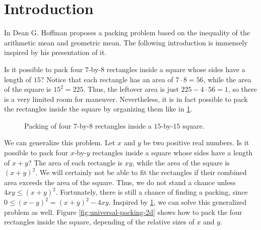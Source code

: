 \section{Introduction}
\noindent In \cite{Hoffman1981} Dean G. Hoffman proposes a packing problem based on the inequality of the arithmetic mean and geometric mean. The following introduction is immensely inspired by his presentation of it.

Is it possible to pack four $7$-by-$8$ rectangles inside a square whose sides have a length of $15$? Notice that each rectangle has an area of $7 \cdot 8 = 56$, while the area of the square is $15^2 = 225$. Thus, the leftover area is just $225 - 4 \cdot 56 = 1$, so there is a very limited room for maneuver. Nevertheless, it is in fact possible to pack the rectangles inside the square by organizing them like in \cref{fig:2d-concrete-packing}.
\begin{figure}[ht]
    \centering
    \caption{Packing of four $7$-by-$8$ rectangles inside a $15$-by-$15$ square.}
    \label{fig:2d-concrete-packing}
\end{figure}

We can generalize this problem. Let $x$ and $y$ be two positive real numbers. Is it possible to pack four $x$-by-$y$ rectangles inside a square whose sides have a length of $x + y$? The area of each rectangle is $xy$, while the area of the square is $(x + y)^2$. We will certainly not be able to fit the rectangles if their combined area exceeds the area of the square. Thus, we do not stand a chance unless $4xy \leq (x + y)^2$. Fortunately, there is still a chance of finding a packing, since $0 \leq (x - y)^2 = (x + y)^2 - 4xy$.
Inspired by \cref{fig:2d-concrete-packing}, we can solve this generalized problem as well. Figure \ref{fig:universal-packing-2d} shows how to pack the four rectangles inside the square, depending of the relative sizes of $x$ and $y$.

